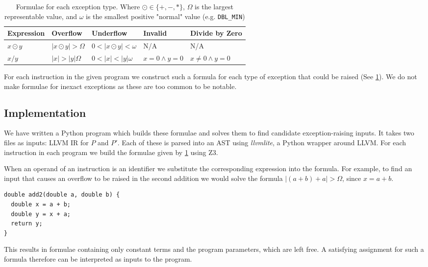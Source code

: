\documentclass{article}
\begin{document}
\begin{table}[h]
\begin{tabular}{lllll}
Expression  & Overflow             & Underflow & Invalid & Divide by Zero \\ \hline
$x \odot y$ & $|x \odot y| > \Omega$ & $0 < |x \odot y| < \omega$ & N/A & N/A \\
$x / y$     & $|x| > |y| \Omega$     & $0 < |x| < |y| \omega $ &
  $x = 0 \land y = 0$ & $x \neq 0 \land y = 0$ \\
\end{tabular}
\caption{Formulae for each exception type. Where $\odot \in \{+, -, *\}$,
  $\Omega$ is the largest representable value, and $\omega$ is the smallest
  positive "normal" value (e.g. \texttt{DBL\_MIN})}
\label{table:formulae}
\end{table}

For each instruction in the given program we construct such a formula for each
type of exception that could be raised (See \ref{table:formulae}). We do not
make formulae for inexact exceptions as these are too common to be notable.

\subsection{Implementation}

We have written a Python program which builds these formulae and solves them to
find candidate exception-raising inputs. It takes two files as inputs: LLVM IR
for $P$ and $P'$. Each of these is parsed into an AST using \textit{llvmlite},
a Python wrapper around LLVM. For each instruction in each program we build
the formulae given by \ref{table:formulae} using Z3.

When an operand of an instruction is an identifier we substitute the
corresponding expression into the formula. For example, to find an input that
causes an overflow to be raised in the second addition we would solve the
formula $|(a + b) + a| > \Omega$, since $x = a + b$.

\begin{lstlisting}
double add2(double a, double b) {
  double x = a + b;
  double y = x + a;
  return y;
}
\end{lstlisting}

This results in formulae containing only constant terms and the program
parameters, which are left free. A satisfying assignment for such a formula
therefore can be interpreted as inputs to the program.
\end{document}
